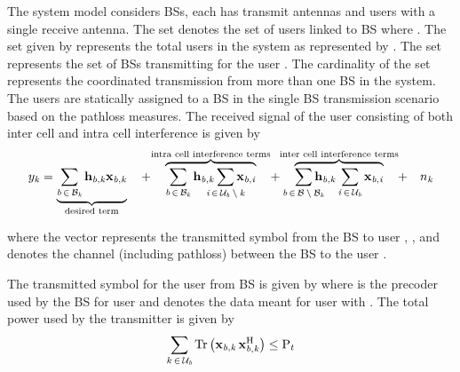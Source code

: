 
The system model considers  BSs, each has  transmit antennas and  users with a single receive antenna. The set  denotes the set of users linked to BS  where . The set  given by  represents the total users in the system as represented by . The set  represents the set of BSs transmitting for the user . The cardinality of the set  represents the coordinated transmission from more than one BS in the system. The users are statically assigned to a BS in the single BS transmission scenario based on the pathloss measures. The received signal  of the user  consisting of both inter cell and intra cell interference is given by
\begin{eqnarray}
\msclxy{y}{k} = \underbrace{\sum_{\mtext{b} \inm \mcxy{B}{k}} \mvecxyz{h}{b}{k} \mvecxyz{x}{b}{k}}_{\mathclap{\text{desired term}}} \quad + \quad \overbrace{\sum_{\mtext{b} \inm \mcxy{B}{k}} \mvecxyz{h}{b}{k} \sum_{\mathclap{\mtext{i} \inm \mcxy{U}{b} \bs \mtext{k}}} \mvecxyz{x}{b}{i}}^{\mathclap{\text{intra cell interference terms}}} \quad + \quad \overbrace{\sum_{\mathclap{\mtext{b} \inm \mc{B} \bs \mcxy{B}{k}}} \mvecxyz{h}{b}{k} \sum_{\mtext{i} \inm \mcxy{U}{b}} \mvecxyz{x}{b}{i}}^{\mathclap{\text{inter cell interference terms}}} \quad + \quad \msclxy{n}{k}
\label{sm-e1}
\end{eqnarray}

where the vector  represents the transmitted symbol from the BS  to user , , and  denotes the channel (including pathloss) between the BS  to the user .

The transmitted symbol  for the user  from BS  is given by  where  is the precoder used by the BS  for user  and  denotes the data meant for user  with . The total power used by the transmitter is given by
\begin{equation}
\sum_{k \, \in \, \mathcal{U}_{\mathit{b}}} \mathrm{Tr} \left ( \mathbf{x}_{\mathit{b},\mathit{k}} \, \mathbf{x}_{\mathit{b},\mathit{k}}^{\mathrm{H}} \right ) \leq \mathrm{P}_{t} 
\label{sm-e2}
\end{equation}

